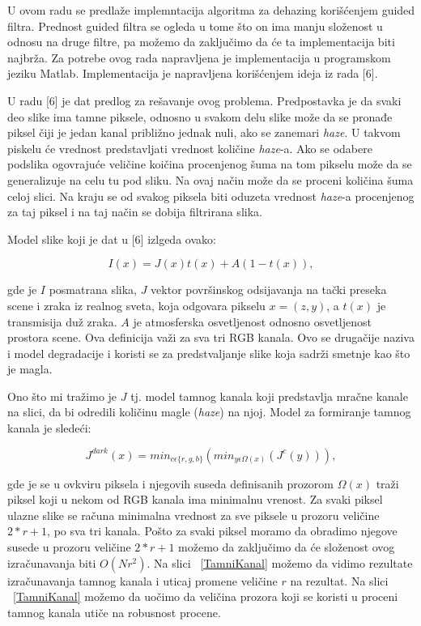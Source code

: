 \documentclass[a4paper,12pt,titlepage]{article}
\begin{document}
U ovom radu se predlaže implemntacija algoritma za dehazing korišćenjem guided filtra. Prednost guided filtra se ogleda u tome što on ima manju složenost u odnosu na druge filtre, pa možemo da zaključimo da će ta implementacija biti najbrža. Za potrebe ovog rada napravljena je implementacija u programskom jeziku Matlab. Implementacija je napravljena korišćenjem ideja iz rada [6]. 

U radu [6] je dat predlog za rešavanje ovog problema. Predpostavka je da svaki deo slike ima tamne piksele, odnosno u svakom delu slike može da se pronađe piksel čiji je jedan kanal približno jednak nuli, ako se zanemari \emph{haze}. U takvom piskelu će vrednost predstavljati vrednost količine \emph{haze}-a. Ako se odabere podslika ogovrajuće veličine koičina procenjenog šuma na tom pikselu može da se generalizuje na celu tu pod sliku. Na ovaj način može da se proceni količina šuma celoj slici. Na kraju se od svakog piksela biti oduzeta vrednost \emph{haze}-a procenjenog za taj piksel i na taj način se dobija filtrirana slika.

Model slike koji je dat u [6] izlgeda ovako:

\begin{equation}\label{eq:haze1}
I(x) = J(x)t(x) + A(1 - t(x)),
\end{equation}

gde je $I$ posmatrana slika, $J$ vektor površinskog odsijavanja na tački preseka scene i zraka iz realnog sveta, koja odgovara pikselu $x = (z, y)$, a $t(x)$ je transmisija duž zraka. $A$ je atmosferska osvetljenost odnosno osvetljenost prostora scene. Ova definicija važi za sva tri RGB kanala. Ovo se drugačije naziva i model degradacije i koristi se za predstvaljanje slike koja sadrži smetnje kao što je magla.   

Ono što mi tražimo je $J$ tj. model tamnog kanala koji predstavlja mračne kanale na slici, da bi odredili količinu magle (\emph{haze}) na njoj. Model za formiranje tamnog kanala je sledeći:

\begin{equation}\label{eq:haze2}
J^{dark}(x) = min_{c \epsilon \{r, g, b \}}( min_{y \epsilon \Omega (x)} (J^c (y)) ),
\end{equation}

gde je se u ovkviru piksela i njegovih suseda definisanih prozorom $\Omega(x)$ traži piksel koji u nekom od RGB kanala ima minimalnu vrenost. Za svaki piksel ulazne slike se računa minimalna vrednost za sve piksele u prozoru veličine $2*r + 1$, po sva tri kanala. Pošto za svaki piksel moramo da obradimo njegove susede u prozoru veličine $2*r + 1$ možemo da zaključimo da će složenost ovog izračunavanja biti $O(Nr^2)$. Na slici ~\ref{TamniKanal} možemo da vidimo rezultate izračunavanja tamnog kanala i uticaj promene veličine $r$ na rezultat. Na slici ~\ref{TamniKanal} možemo da uočimo da veličina prozora koji se koristi u proceni tamnog kanala utiče na robusnost procene. 
\end{document}
